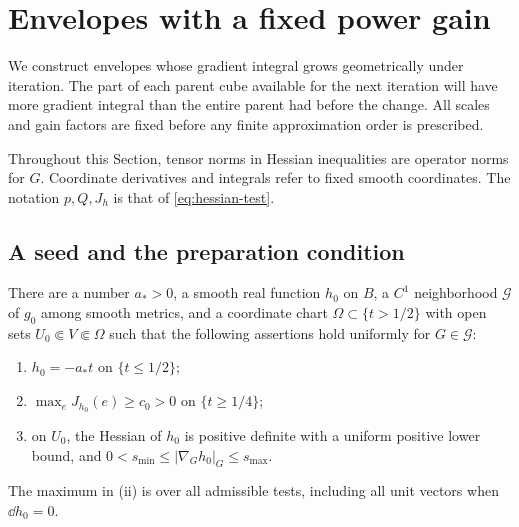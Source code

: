 \section{Envelopes with a fixed power gain}\label{sec:envelopes}

We construct envelopes whose gradient integral grows geometrically under
iteration.  The part of each parent cube available for the next iteration
will have more gradient integral than the entire parent had before the
change.  All scales and gain factors are fixed before any finite
approximation order is prescribed.

Throughout this Section, tensor norms in Hessian inequalities are operator
norms for $G$.  Coordinate derivatives and integrals refer to fixed smooth
coordinates.  The notation $p,Q,J_h$ is that of
\eqref{eq:hessian-test}.

\subsection{A seed and the preparation condition}

\begin{lemma}\label{lem:seed}
There are a number $a_*>0$, a smooth real function $h_0$ on $B$, a
$C^1$ neighborhood $\mathcal G$ of $g_0$ among smooth metrics, and a
coordinate chart $\Omega\subset\{t>1/2\}$ with open sets
$U_0\Subset V\Subset\Omega$ such that the following assertions hold
uniformly for $G\in\mathcal G$:
\begin{enumerate}[label=\textup{(\roman*)}]
 \item $h_0=-a_*t$ on $\{t\le1/2\}$;
 \item $\max_e J_{h_0}(e)\ge c_0>0$ on $\{t\ge1/4\}$;
 \item on $U_0$, the Hessian of $h_0$ is positive definite with a
 uniform positive lower bound, and
 $0<s_{\min}\le|\nabla_Gh_0|_G\le s_{\max}$.
\end{enumerate}
The maximum in \textup{(ii)} is over all admissible tests, including all
unit vectors when $\dd h_0=0$.
\end{lemma}

